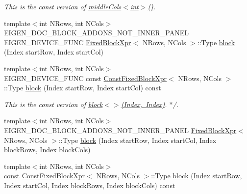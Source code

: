 \begin{DoxyCompactItemize}
\begin{DoxyCompactList}\small\item\em This is the const version of \mbox{\hyperlink{class_eigen_1_1_dense_base_a3fc39624015c1702d22ebb322aa9ebce}{middle\+Cols$<$int$>$()}}. \end{DoxyCompactList}\item 
{\footnotesize template$<$int N\+Rows, int N\+Cols$>$ }\\E\+I\+G\+E\+N\+\_\+\+D\+O\+C\+\_\+\+B\+L\+O\+C\+K\+\_\+\+A\+D\+D\+O\+N\+S\+\_\+\+N\+O\+T\+\_\+\+I\+N\+N\+E\+R\+\_\+\+P\+A\+N\+EL E\+I\+G\+E\+N\+\_\+\+D\+E\+V\+I\+C\+E\+\_\+\+F\+U\+NC \mbox{\hyperlink{struct_eigen_1_1_dense_base_1_1_fixed_block_xpr}{Fixed\+Block\+Xpr}}$<$ N\+Rows, N\+Cols $>$\+::Type \mbox{\hyperlink{class_eigen_1_1_dense_base_adfadb0b888358ae1f521cc0a106ddb85}{block}} (Index start\+Row, Index start\+Col)
\item 
\mbox{\label{class_eigen_1_1_dense_base_a8b39d175ffe3fcee80ad49b37e7b97e2}} 
{\footnotesize template$<$int N\+Rows, int N\+Cols$>$ }\\E\+I\+G\+E\+N\+\_\+\+D\+E\+V\+I\+C\+E\+\_\+\+F\+U\+NC const \mbox{\hyperlink{struct_eigen_1_1_dense_base_1_1_const_fixed_block_xpr}{Const\+Fixed\+Block\+Xpr}}$<$ N\+Rows, N\+Cols $>$\+::Type \mbox{\hyperlink{class_eigen_1_1_dense_base_a8b39d175ffe3fcee80ad49b37e7b97e2}{block}} (Index start\+Row, Index start\+Col) const
\begin{DoxyCompactList}\small\item\em This is the const version of \mbox{\hyperlink{class_eigen_1_1_dense_base_adfadb0b888358ae1f521cc0a106ddb85}{block$<$$>$(\+Index, Index)}}. $\ast$/. \end{DoxyCompactList}\item 
{\footnotesize template$<$int N\+Rows, int N\+Cols$>$ }\\E\+I\+G\+E\+N\+\_\+\+D\+O\+C\+\_\+\+B\+L\+O\+C\+K\+\_\+\+A\+D\+D\+O\+N\+S\+\_\+\+N\+O\+T\+\_\+\+I\+N\+N\+E\+R\+\_\+\+P\+A\+N\+EL \mbox{\hyperlink{struct_eigen_1_1_dense_base_1_1_fixed_block_xpr}{Fixed\+Block\+Xpr}}$<$ N\+Rows, N\+Cols $>$\+::Type \mbox{\hyperlink{class_eigen_1_1_dense_base_ae2823bb4a035d2e6ae3c906f57f5c895}{block}} (Index start\+Row, Index start\+Col, Index block\+Rows, Index block\+Cols)
\item 
\mbox{\label{class_eigen_1_1_dense_base_adcadf0223a613e236ebc7c717e29c5c0}} 
{\footnotesize template$<$int N\+Rows, int N\+Cols$>$ }\\const \mbox{\hyperlink{struct_eigen_1_1_dense_base_1_1_const_fixed_block_xpr}{Const\+Fixed\+Block\+Xpr}}$<$ N\+Rows, N\+Cols $>$\+::Type \mbox{\hyperlink{class_eigen_1_1_dense_base_adcadf0223a613e236ebc7c717e29c5c0}{block}} (Index start\+Row, Index start\+Col, Index block\+Rows, Index block\+Cols) const

\end{DoxyCompactItemize}

